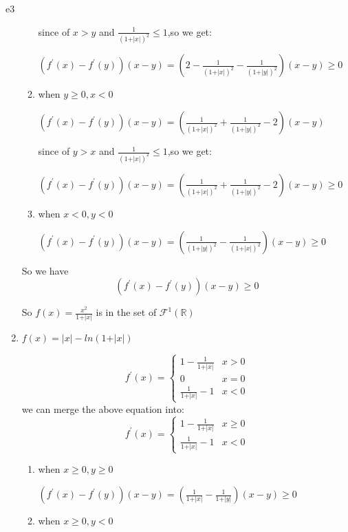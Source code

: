 \documentclass{article}
\begin{document}
\begin{PROOF}{e3}
\begin{enumerate}
\begin{enumerate}
			since of $x>y$ and $\frac{1}{(1+\vert x\vert)^2}\le 1$,so we get:
			
			$\left( f^{'}(x)-f^{'}(y)\right) (x-y)=(2-\frac{1}{(1+\vert x\vert)^2}-\frac{1}{(1+\vert y\vert)^2})(x-y)\ge 0$
			
			\item when $y\ge 0,x<0$ 
			
			$\left( f^{'}(x)-f^{'}(y)\right) (x-y)=(\frac{1}{(1+\vert x\vert)^2}+\frac{1}{(1+\vert y\vert)^2} - 2)(x-y)$
			
			since of $y>x$ and $\frac{1}{(1+\vert x\vert)^2}\le 1$,so we get:
			
			$\left( f^{'}(x)-f^{'}(y)\right) (x-y)=(\frac{1}{(1+\vert x\vert)^2}+\frac{1}{(1+\vert y\vert)^2} - 2)(x-y)\ge 0$

			\item when $x<0,y<0$
			
			$\left( f^{'}(x)-f^{'}(y)\right) (x-y)=(\frac{1}{(1+\vert y\vert)^2}-\frac{1}{(1+\vert x\vert)^2})(x-y)\ge 0$
		\end{enumerate}

		So we have 
		\[\left( f^{'}(x)-f^{'}(y)\right) (x-y)\ge 0\]
		
		So $f(x)=\frac{x^2}{1+\vert x\vert}$ is in the set of $\mathcal{F}^1(\mathbb{R})$

	\item $f(x)=\vert x\vert -ln(1+\vert x\vert)$
	
	\begin{equation}
		f^{'}(x)=\begin{cases}
			1-\frac{1}{1+\vert x\vert}&x>0\\
			0&x=0\\
			\frac{1}{1+\vert x\vert}-1&x<0
		\end{cases}
	\end{equation}
	we can merge the above equation into:
	\begin{equation}
		f^{'}(x)=\begin{cases}
			1-\frac{1}{1+\vert x\vert}&x\ge 0\\
			\frac{1}{1+\vert x\vert}-1&x<0
		\end{cases}
	\end{equation}
	\begin{enumerate}
		\item when $x\ge 0,y\ge 0$
		
		$\left( f^{'}(x)-f^{'}(y)\right) (x-y)=(\frac{1}{1+\vert x\vert}-\frac{1}{1+\vert y\vert})(x-y)\ge 0$
		\item when $x\ge 0,y<0$
		

\end{enumerate}
\end{enumerate}
\end{PROOF}
\end{document}
